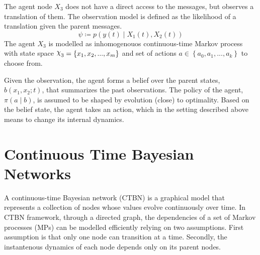 The agent node $ X_3 $ does not have a direct access to the messages, but observes a translation of them. The observation model is defined as the likelihood of a translation given the parent messages.
\begin{equation}
\psi \coloneqq p(y(t) \mid X_{1}(t), X_{2}(t))
\end{equation}
The agent  $ X_{3} $ is modelled as inhomogenouos continuous-time Markov process with state space $ \rchi_{3} = \left\lbrace x_{1}, x_{2}, ..., x_{m} \right\rbrace  $ and set of actions $ a \in \left\lbrace a_{0}, a_{1}, ..., a_{k}\right\rbrace  $ to choose from. 

Given the observation, the agent forms a belief over the parent states, $  b(x_{1}, x_{2}; t) $, that summarizes the past observations. The policy of the agent, $ \pi(a \mid b) $, is assumed to be shaped by evolution (close) to optimality. Based on the belief state, the agent takes an action, which in the setting described above means to change its internal dynamics. 
\section{Continuous Time Bayesian Networks}
A continuous-time Bayesian network (CTBN) is a graphical model that represents a collection of nodes whose values evolve continuously over time. In CTBN framework, through a directed graph, the dependencies of a set of Markov processes (MPs) can be modelled efficiently relying on two assumptions. First assumption is that only one node can transition at a time. Secondly, the instantenous dynamics of each node depends only on its parent nodes. \cite{Cohn2010a, Nodelman1995} 

